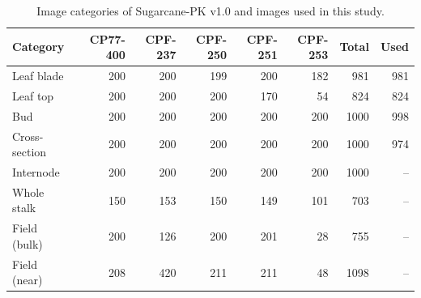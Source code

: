 \begin{table}[tbp]
\centering
\footnotesize
\caption{Image categories of Sugarcane-PK v1.0 and images used in this study.}
\label{tab:integrity}
\begin{tabular}{lrrrrrrr}
\toprule
Category & CP77-400 & CPF-237 & CPF-250 & CPF-251 & CPF-253 & Total & Used \\
\midrule
Leaf blade & 200 & 200 & 199 & 200 & 182 & 981 & 981 \\
Leaf top & 200 & 200 & 200 & 170 & 54 & 824 & 824 \\
Bud & 200 & 200 & 200 & 200 & 200 & 1000 & 998 \\
Cross-section & 200 & 200 & 200 & 200 & 200 & 1000 & 974 \\
Internode & 200 & 200 & 200 & 200 & 200 & 1000 & -- \\
Whole stalk & 150 & 153 & 150 & 149 & 101 & 703 & -- \\
Field (bulk) & 200 & 126 & 200 & 201 & 28 & 755 & -- \\
Field (near) & 208 & 420 & 211 & 211 & 48 & 1098 & -- \\
\bottomrule
\end{tabular}
\end{table}